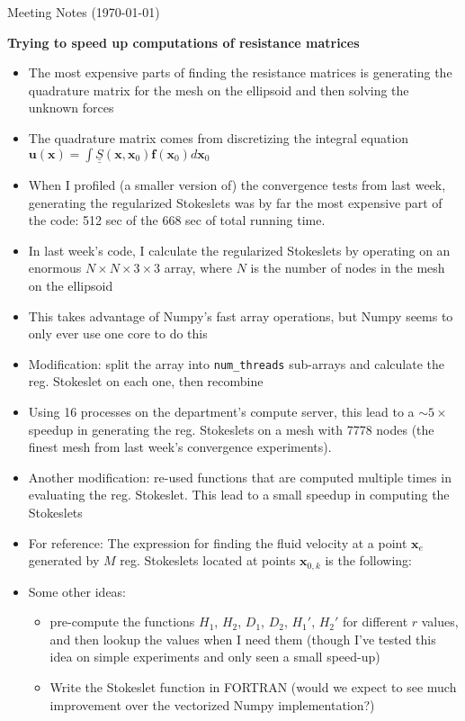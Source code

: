 \documentclass{article}
\begin{document}
\pagestyle{plain}

\begin{center}
  {\Large Meeting Notes (\today)}
\end{center}

\textbf{Trying to speed up computations of resistance matrices}
\begin{itemize}
\item The most expensive parts of finding the resistance matrices is
  generating the quadrature matrix for the mesh on the ellipsoid and
  then solving the unknown forces
\item The quadrature matrix comes from discretizing the integral
  equation $\mathbf{u}(\mathbf{x}) = \int
  \underline{\underline{S}}(\mathbf{x}, \mathbf{x}_0)
  \mathbf{f}(\mathbf{x}_0) d\mathbf{x}_0$
\item When I profiled (a smaller version of) the convergence tests
  from last week, generating the regularized Stokeslets was by far the
  most expensive part of the code: 512 sec of the 668 sec of total
  running time.
\item In last week's code, I calculate the regularized Stokeslets by
  operating on an enormous $N \times N \times 3 \times 3$ array, where
  $N$ is the number of nodes in the mesh on the ellipsoid
\item This takes advantage of Numpy's fast array operations, but Numpy
  seems to only ever use one core to do this
\item Modification: split the array into \verb|num_threads|
  sub-arrays and calculate the reg. Stokeslet on each one, then
  recombine
\item Using 16 processes on the department's compute server, this lead
  to a $\sim5 \times$ speedup in generating the reg. Stokeslets on a
  mesh with 7778 nodes (the finest mesh from last week's convergence
  experiments).
\item Another modification: re-used functions that are computed
  multiple times in evaluating the reg. Stokeslet. This lead to a
  small speedup in computing the Stokeslets
\item For reference: The expression for finding the fluid velocity at a point
  $\mathbf{x}_e$ generated by $M$ reg. Stokeslets located at points
  $\mathbf{x}_{0, k}$ is the following:

\item Some other ideas:
  \begin{itemize}
  \item pre-compute the functions $H_1$, $H_2$, $D_1$, $D_2$, $H_1'$,
    $H_2'$ for different $r$ values, and then lookup the values when I
    need them (though I've tested this idea on simple experiments and
    only seen a small speed-up)
  \item Write the Stokeslet function in FORTRAN (would we expect to
    see much improvement over the vectorized Numpy implementation?)
  \end{itemize}
\end{itemize}
\end{document}
